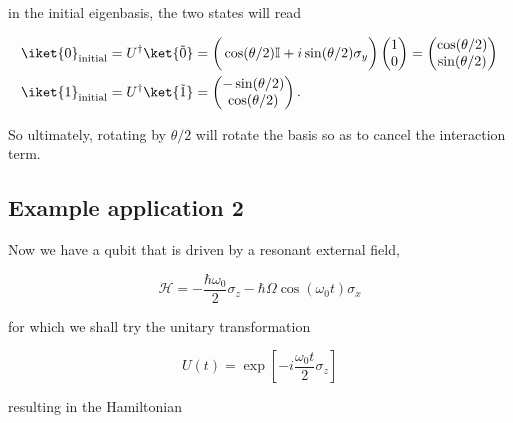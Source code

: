   \noindent in the initial eigenbasis, the two states will read

  \begin{equation}\label{uniInitial}
    \begin{aligned}
      \iket{0}_{\text{initial}}               &               =               U^{\dagger}\ket{\tilde{0}}               =
      \bigg(\cos(\theta/2)\mathbb{I}+i\sin(\theta/2)\sigma_y\bigg)\begin{pmatrix} 1\\0
      \end{pmatrix} = \begin{pmatrix} \cos(\theta/2)\\\sin(\theta/2)
      \end{pmatrix} \\
      \iket{1}_{\text{initial}} & = U^{\dagger}\ket{\tilde{1}} = \begin{pmatrix} -\sin(\theta/2)\\\cos(\theta/2)
      \end{pmatrix}.
    \end{aligned}
  \end{equation}


  \noindent So ultimately, rotating by $ \theta/2 $ will rotate the basis so as to cancel the interaction term.

 \subsection{Example application 2\label{subsec:Rabi}}
 Now we have a qubit that  is driven by a resonant external field, 

  \begin{equation}\label{app2}
    \mathcal{H} = -\frac{\hbar\omega_0}{2}\sigma_z-\hbar\Omega\cos(\omega_0 t)\sigma_x
  \end{equation}

  \noindent for which we shall try the unitary transformation

  \begin{equation}\label{app2Try}
    U(t) = \exp\left[-i\frac{\omega_0 t}{2}\sigma_z\right]
  \end{equation}

  \noindent resulting in the Hamiltonian

